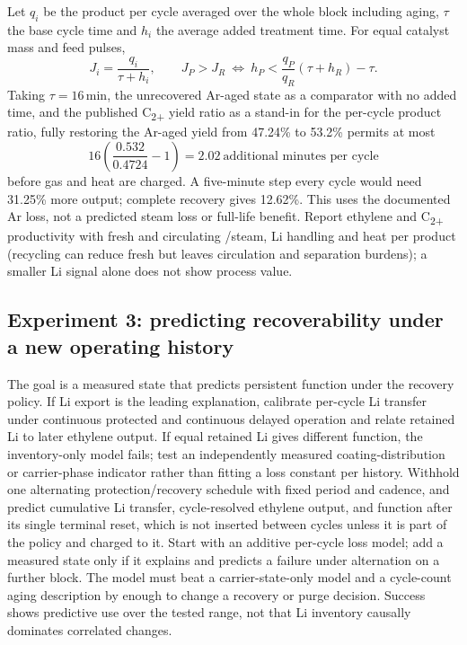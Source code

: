 Let $q_i$ be the product per cycle averaged over the whole block including aging, $\tau$ the base cycle time and $h_i$ the average added treatment time. For equal catalyst mass and feed pulses,
\begin{equation}
 J_i=\frac{q_i}{\tau+h_i},\qquad
 J_P>J_R\ \Longleftrightarrow\
 h_P<\frac{q_P}{q_R}(\tau+h_R)-\tau.
 \label{eq:cyclic-value}
\end{equation}
Taking $\tau=16$\,min, the unrecovered Ar-aged state as a comparator with no added time, and the published C\textsubscript{2+} yield ratio as a stand-in for the per-cycle product ratio, fully restoring the Ar-aged yield from 47.24\% to 53.2\% permits at most
\begin{equation}
 16\left(\frac{0.532}{0.4724}-1\right)=2.02\ \text{additional minutes per cycle}
 \label{eq:cyclic-threshold}
\end{equation}
before gas and heat are charged. A five-minute step every cycle would need 31.25\% more output; complete recovery gives 12.62\%. This uses the documented Ar loss, not a predicted steam loss or full-life benefit.\cite{brody2022} Report ethylene and C\textsubscript{2+} productivity with fresh and circulating \COtwo{}/steam, Li handling and heat per product (recycling can reduce fresh \COtwo{} but leaves circulation and separation burdens); a smaller Li signal alone does not show process value.

\subsection{Experiment 3: predicting recoverability under a new operating history}

The goal is a measured state that predicts persistent function under the recovery policy. If Li export is the leading explanation, calibrate per-cycle Li transfer under continuous protected and continuous delayed operation and relate retained Li to later ethylene output. If equal retained Li gives different function, the inventory-only model fails; test an independently measured coating-distribution or carrier-phase indicator rather than fitting a loss constant per history. Withhold one alternating protection/recovery schedule with fixed period and cadence, and predict cumulative Li transfer, cycle-resolved ethylene output, and function after its single terminal reset, which is not inserted between cycles unless it is part of the policy and charged to it. Start with an additive per-cycle loss model; add a measured state only if it explains and predicts a failure under alternation on a further block. The model must beat a carrier-state-only model and a cycle-count aging description by enough to change a recovery or purge decision. Success shows predictive use over the tested range, not that Li inventory causally dominates correlated changes.


